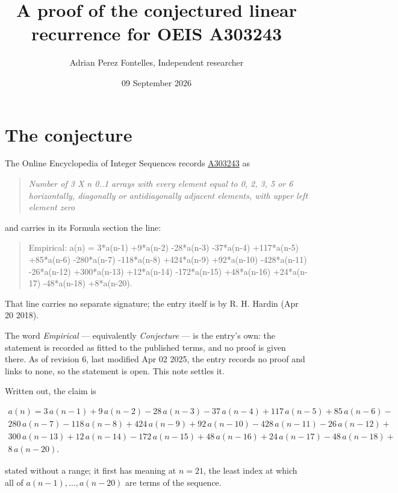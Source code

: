 \documentclass[11pt]{article}
\title{A proof of the conjectured linear recurrence for OEIS A303243}
\author{Adrian Perez Fontelles, Independent researcher}
\date{09 September 2026}
\theoremstyle{definition}
\begin{document}
\maketitle
\section{The conjecture}

The Online Encyclopedia of Integer Sequences records \href{https://oeis.org/A303243}{A303243} as

\begin{quote}\itshape Number of 3 X n 0..1 arrays with every element equal to 0, 2, 3, 5 or 6 horizontally, diagonally or antidiagonally adjacent elements, with upper left element zero\end{quote}

and carries in its Formula section the line:

\begin{quote}\ttfamily Empirical: a(n) = 3*a(n-1) +9*a(n-2) -28*a(n-3) -37*a(n-4) +117*a(n-5) +85*a(n-6) -280*a(n-7) -118*a(n-8) +424*a(n-9) +92*a(n-10) -428*a(n-11) -26*a(n-12) +300*a(n-13) +12*a(n-14) -172*a(n-15) +48*a(n-16) +24*a(n-17) -48*a(n-18) +8*a(n-20).\end{quote}

That line carries no separate signature; the entry itself is by R. H. Hardin (Apr 20 2018).

The word {\itshape Empirical} --- equivalently {\itshape Conjecture} --- is the entry's own: the statement is recorded as fitted to the published terms, and no proof is given there. As of revision 6, last modified Apr 02 2025, the entry records no proof and links to none, so the statement is open. This note settles it.

Written out, the claim is

\begin{multline*} a(n) = 3\,a(n-1) + 9\,a(n-2) - 28\,a(n-3) - 37\,a(n-4) + 117\,a(n-5) + 85\,a(n-6) - \\ 280\,a(n-7) - 118\,a(n-8) + 424\,a(n-9) + 92\,a(n-10) - 428\,a(n-11) - 26\,a(n-12) + \\ 300\,a(n-13) + 12\,a(n-14) - 172\,a(n-15) + 48\,a(n-16) + 24\,a(n-17) - 48\,a(n-18) + \\ 8\,a(n-20). \end{multline*}

stated without a range; it first has meaning at $n = 21$, the least index at which all of $a(n-1),\dots,a(n-20)$ are terms of the sequence.
\end{document}
